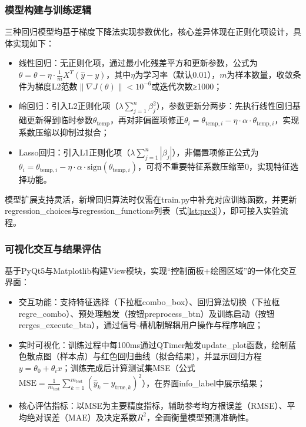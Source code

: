 \subsubsection{模型构建与训练逻辑}
三种回归模型均基于梯度下降法实现参数优化，核心差异体现在正则化项设计，具体实现如下：
\begin{itemize}
    \item {线性回归}：无正则化项，通过最小化残差平方和更新参数，公式为$\theta = \theta - \eta \cdot \frac{1}{m}X^T(\hat{y}-y)$，其中$\eta$为学习率（默认0.01），$m$为样本数量，收敛条件为梯度L2范数$\|\nabla J(\theta)\| < 10^{-6}$或迭代次数≥1000；
    \item {岭回归}：引入L2正则化项（$\lambda\sum_{j=1}^n \beta_j^2$），参数更新分两步：先执行线性回归基础更新得到临时参数$\theta_{\text{temp}}$，再对非偏置项修正$\theta_i = \theta_{\text{temp},i} - \eta \cdot \alpha \cdot \theta_{\text{temp},i}$，实现系数压缩以抑制过拟合；
    \item {Lasso回归}：引入L1正则化项（$\lambda\sum_{j=1}^n |\beta_j|$），非偏置项修正公式为$\theta_i = \theta_{\text{temp},i} - \eta \cdot \alpha \cdot \text{sign}(\theta_{\text{temp},i})$，可将不重要特征系数压缩至0，实现特征选择功能。
\end{itemize}
模型扩展支持灵活，新增回归算法时仅需在train.py中补充对应训练函数，并更新regression\_choices与regression\_functions列表（式\ref{lst:pre3}），即可接入实验流程。

\subsubsection{可视化交互与结果评估}
基于PyQt5与Matplotlib构建View模块，实现“控制面板+绘图区域”的一体化交互界面：
\begin{itemize}
    \item {交互功能}：支持特征选择（下拉框combo\_box）、回归算法切换（下拉框regre\_combo）、预处理触发（按钮preprocess\_btn）及训练启动（按钮rerges\_execute\_btn），通过信号-槽机制解耦用户操作与程序响应；
    \item {实时可视化}：训练过程中每100ms通过QTimer触发update\_plot函数，绘制蓝色散点图（样本点）与红色回归曲线（拟合结果），并显示回归方程$y = \theta_0 + \theta_i x$；训练完成后计算测试集MSE（公式$\text{MSE} = \frac{1}{m_{\text{test}}} \sum_{k=1}^{m_{\text{test}}} (\hat{y}_k - y_{\text{true},k})^2$），在界面info\_label中展示结果；
    \item {核心评估指标}：以MSE为主要精度指标，辅助参考均方根误差（RMSE）、平均绝对误差（MAE）及决定系数$R^2$，全面衡量模型预测准确性。
\end{itemize}

